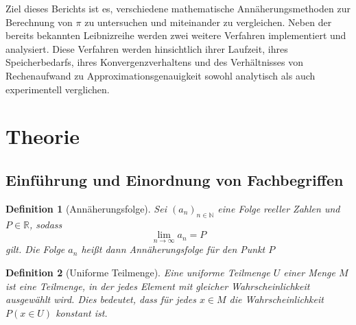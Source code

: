 \documentclass{scrartcl}
\newtheorem{definition}{Definition}
\theoremstyle{definition}
\newtheorem{approximation sequence}{Annäherungsfolge}
\begin{document}
Ziel dieses Berichts ist es, verschiedene mathematische Annäherungsmethoden zur
Berechnung von \(\pi\) zu untersuchen und miteinander zu vergleichen.
Neben der bereits bekannten Leibnizreihe werden zwei weitere Verfahren
implementiert und analysiert.
Diese Verfahren werden hinsichtlich ihrer Laufzeit, ihres Speicherbedarfs,
ihres Konvergenzverhaltens und des Verhältnisses von Rechenaufwand zu
Approximationsgenauigkeit sowohl analytisch als auch experimentell verglichen.


\section{Theorie}

\subsection{Einführung und Einordnung von Fachbegriffen}

\begin{definition}[Annäherungsfolge]
    Sei \((a_n)_{n \in \mathbb{N}}\) eine Folge reeller Zahlen und \(P \in \mathbb{R}\), sodass
    \[\lim_{n \to \infty} a_n = P \] gilt. Die Folge \(a_n\) heißt dann Annäherungsfolge für den Punkt \(P\)

\end{definition}

\begin{definition}[Uniforme Teilmenge]
    Eine uniforme Teilmenge \(U\) einer Menge \(M\) ist eine Teilmenge, in der
    jedes Element mit gleicher Wahrscheinlichkeit ausgewählt wird.
    Dies bedeutet, dass für jedes \(x \in M\) die Wahrscheinlichkeit \(P(x \in U)\)
    konstant ist.
\end{definition}
\end{document}
